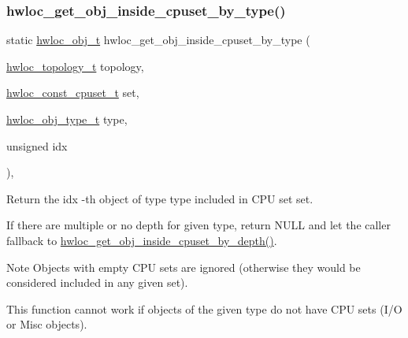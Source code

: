 \subsubsection{\texorpdfstring{hwloc\+\_\+get\+\_\+obj\+\_\+inside\+\_\+cpuset\+\_\+by\+\_\+type()}{hwloc\_get\_obj\_inside\_cpuset\_by\_type()}}
{\footnotesize\ttfamily static \hyperlink{a00185_ga79b8ab56877ef99ac59b833203391c7d}{hwloc\+\_\+obj\+\_\+t} hwloc\+\_\+get\+\_\+obj\+\_\+inside\+\_\+cpuset\+\_\+by\+\_\+type (\begin{DoxyParamCaption}\item[{\hyperlink{a00186_ga9d1e76ee15a7dee158b786c30b6a6e38}{hwloc\+\_\+topology\+\_\+t}}]{topology,  }\item[{\hyperlink{a00183_ga1f784433e9b606261f62d1134f6a3b25}{hwloc\+\_\+const\+\_\+cpuset\+\_\+t}}]{set,  }\item[{\hyperlink{a00184_gacd37bb612667dc437d66bfb175a8dc55}{hwloc\+\_\+obj\+\_\+type\+\_\+t}}]{type,  }\item[{unsigned}]{idx }\end{DoxyParamCaption})\hspace{0.3cm}{\ttfamily [inline]}, {\ttfamily [static]}}



Return the {\ttfamily idx} -\/th object of type {\ttfamily type} included in C\+PU set {\ttfamily set}. 

If there are multiple or no depth for given type, return {\ttfamily N\+U\+LL} and let the caller fallback to \hyperlink{a00195_gaec86f1f88832836e3f9338e246ea5862}{hwloc\+\_\+get\+\_\+obj\+\_\+inside\+\_\+cpuset\+\_\+by\+\_\+depth()}.

\begin{DoxyNote}{Note}
Objects with empty C\+PU sets are ignored (otherwise they would be considered included in any given set).

This function cannot work if objects of the given type do not have C\+PU sets (I/O or Misc objects). 
\end{DoxyNote}
